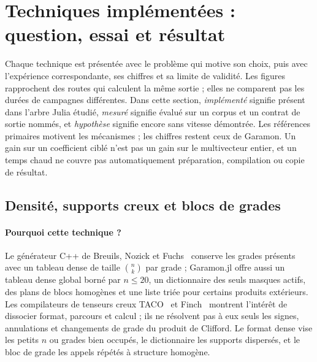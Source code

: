 \documentclass[11pt,a4paper]{article}
\begin{document}
\section{Techniques implémentées : question, essai et résultat}
\label{sec:techniques}
Chaque technique est présentée avec le problème qui motive son choix,
puis avec l'expérience correspondante, ses chiffres et sa limite de
validité. Les figures rapprochent des routes qui calculent la même
sortie ; elles ne comparent pas les durées de campagnes différentes.
Dans cette section, \emph{implémenté} signifie présent dans l'arbre Julia
étudié, \emph{mesuré} signifie évalué sur un corpus et un contrat de sortie
nommés, et \emph{hypothèse} signifie encore sans vitesse démontrée. Les
références primaires motivent les mécanismes ; les chiffres restent ceux de
Garamon. Un gain sur un coefficient ciblé n'est pas un gain sur le
multivecteur entier, et un temps chaud ne couvre pas automatiquement
préparation, compilation ou copie de résultat.

\subsection{Densité, supports creux et blocs de grades}
\paragraph{Pourquoi cette technique ?}
Le générateur C++ de Breuils, Nozick et Fuchs~\cite{breuils2019} conserve
les grades présents avec un tableau dense de taille $\binom nk$ par grade ;
Garamon.jl offre aussi un tableau dense global borné par $n\leq20$, un
dictionnaire des seuls masques actifs, des plans de blocs homogènes et une
liste triée pour certains produits extérieurs. Les compilateurs de tenseurs
creux TACO~\cite{taco} et Finch~\cite{finch} montrent l'intérêt de dissocier
format, parcours et calcul ; ils ne résolvent pas à eux seuls les signes,
annulations et changements de grade du produit de Clifford. Le format dense
vise les petits $n$ ou grades bien occupés, le dictionnaire les supports
dispersés, et le bloc de grade les appels répétés à structure homogène.
\end{document}
